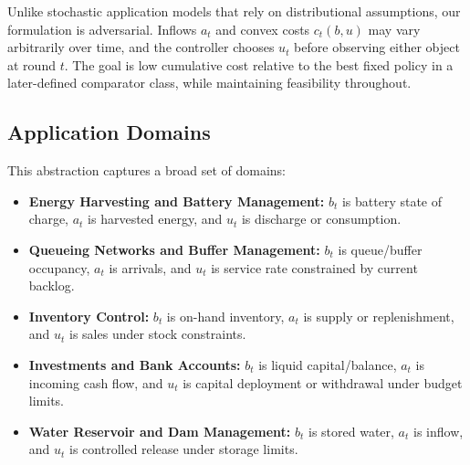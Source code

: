 \documentclass[11pt]{article}
\begin{document}
Unlike stochastic application models that rely on distributional assumptions, our formulation is adversarial. Inflows $a_t$ and convex costs $c_t(b, u)$ may vary arbitrarily over time, and the controller chooses $u_t$ before observing either object at round $t$. The goal is low cumulative cost relative to the best fixed policy in a later-defined comparator class, while maintaining feasibility throughout.

\subsection{Application Domains}
This abstraction captures a broad set of domains:
\begin{itemize}
    \item \textbf{Energy Harvesting and Battery Management:} $b_t$ is battery state of charge, $a_t$ is harvested energy, and $u_t$ is discharge or consumption.
    \item \textbf{Queueing Networks and Buffer Management:} $b_t$ is queue/buffer occupancy, $a_t$ is arrivals, and $u_t$ is service rate constrained by current backlog.
    \item \textbf{Inventory Control:} $b_t$ is on-hand inventory, $a_t$ is supply or replenishment, and $u_t$ is sales under stock constraints.
    \item \textbf{Investments and Bank Accounts:} $b_t$ is liquid capital/balance, $a_t$ is incoming cash flow, and $u_t$ is capital deployment or withdrawal under budget limits.
    \item \textbf{Water Reservoir and Dam Management:} $b_t$ is stored water, $a_t$ is inflow, and $u_t$ is controlled release under storage limits.
\end{itemize}


\end{document}
